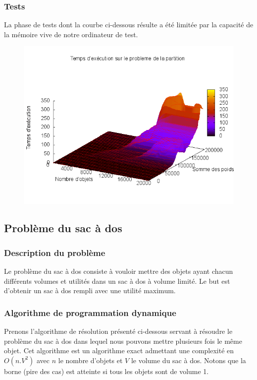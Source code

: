\subsubsection{Tests}
La phase de tests dont la courbe ci-dessous résulte a été limitée par la capacité de la mémoire vive de notre ordinateur de test.
\begin{figure}[H]
	\includegraphics[width=\linewidth]{../pratique/prog_dynamique_dev/res/partition.png}
\end{figure}


\subsection{Problème du sac à dos}

\subsubsection{Description du problème}
Le problème du sac à dos consiste à vouloir mettre des objets ayant chacun différents volumes et utilités dans un sac à dos à volume limité. Le but est d'obtenir un sac à dos rempli avec une utilité maximum.

\subsubsection{Algorithme de programmation dynamique}
Prenons l'algorithme de résolution présenté ci-dessous servant à résoudre le problème du sac à dos dans lequel nous pouvons mettre plusieurs fois le même objet. Cet algorithme est un algorithme exact admettant une complexité en $O(n.V^2)$ avec $n$ le nombre d'objets et $V$ le volume du sac à dos. Notons que la borne (pire des cas) est atteinte si tous les objets sont de volume 1.


